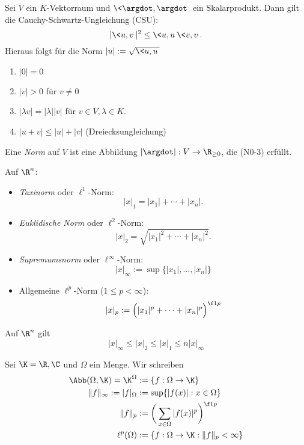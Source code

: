 
\begin{st}
	Sei $V$ ein $K$-Vektorraum und $\<\argdot, \argdot\>$ ein Skalarprodukt.
	Dann gilt die Cauchy-Schwartz-Ungleichung (CSU):
	\[
		|\<u,v\>|^2 \le \<u,u\> \<v,v\>.
	\]
	Hieraus folgt für die Norm $|u| := \sqrt{\<u,u\>}$
	\begin{enumerate}[({N}1),start=0]
		\item
			$|0| = 0$
		\item
			$|v| > 0$ für  $v\neq 0$
		\item
			$|\lambda v| = |\lambda| |v|$ für $v \in V, \lambda \in K$.
		\item
			$|u+v| \le |u| + |v|$ (Dreiecksungleichung)
	\end{enumerate}
\end{st}

\begin{df}
	Eine \emph{Norm} auf $V$ ist eine Abbildung $|\argdot| : V \to \R_{\ge 0}$, die (N0-3) erfüllt.
\end{df}

\begin{ex}
	Auf $\R^n$:
	\begin{itemize}
		\item
			\emph{Taxinorm} oder $\ell^1$-Norm:
			\[
				|x|_1 = |x_1| + \dotsb + |x_n|.
			\]
		\item
			\emph{Euklidische Norm} oder $\ell^2$-Norm:
			\[
				|x|_2 = \sqrt{|x_1|^2 + \dotsb + |x_n|^2}.
			\]
		\item
			\emph{Supremumsnorm} oder $\ell^\infty$-Norm:
			\[
				|x|_\infty := \sup \{ |x_1|, \dotsc, |x_n| \}
			\]
		\item
			Allgemeine $\ell^p$-Norm ($1\le p < \infty$):
			\[
				|x|_p := \Big( |x_1|^p + \dotsb + |x_n|^p \Big)^{\f 1p}
			\]
	\end{itemize}
	\begin{note}
		Auf $\R^n$ gilt
		\[
			|x|_\infty
			\le |x|_2
			\le |x|_1
			\le n |x|_\infty
		\]
	\end{note}
\end{ex}

\begin{ex}
	Sei $\K = \R, \C$ und $\Omega$ ein Menge.
	Wir schreiben
	\begin{align*}
		\Abb(\Omega, \K) = \K^\Omega &:= \{f : \Omega \to \K\} \\
		\|f\|_{\infty} := |f|_\Omega &:= \sup \{ |f(x)| : x \in \Omega \} \\
		\|f\|_{p} &:= \bigg( \sum_{x\in\Omega} |f(x)|^p \bigg)^{\f 1p} \\
		\ell^p(\Omega) &:= \{ f : \Omega \to \K : \|f\|_p < \infty \}
	\end{align*}
\end{ex}

